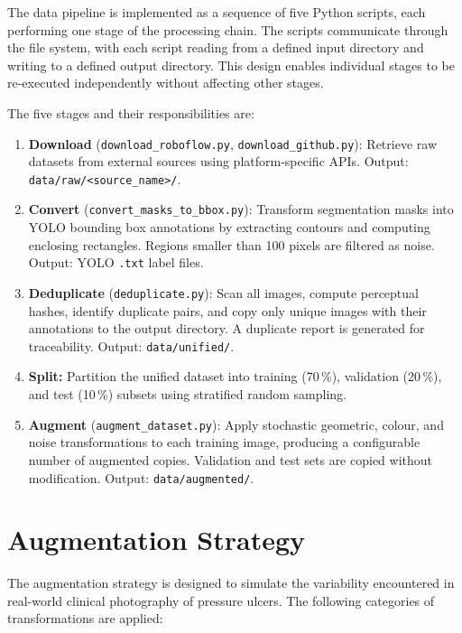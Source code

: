 \documentclass[a4paper,12pt,twoside]{report}
\begin{document}
The data pipeline is implemented as a sequence of five Python scripts, each
performing one stage of the processing chain. The scripts communicate through
the file system, with each script reading from a defined input directory and
writing to a defined output directory. This design enables individual stages to
be re-executed independently without affecting other stages.

The five stages and their responsibilities are:

\begin{enumerate}
  \item \textbf{Download} (\texttt{download\_roboflow.py},
    \texttt{download\_github.py}): Retrieve raw datasets from external sources
    using platform-specific APIs. Output: \texttt{data/raw/<source\_name>/}.

  \item \textbf{Convert} (\texttt{convert\_masks\_to\_bbox.py}): Transform
    segmentation masks into YOLO bounding box annotations by extracting contours
    and computing enclosing rectangles. Regions smaller than 100 pixels are
    filtered as noise. Output: YOLO \texttt{.txt} label files.

  \item \textbf{Deduplicate} (\texttt{deduplicate.py}): Scan all images, compute
    perceptual hashes, identify duplicate pairs, and copy only unique images with
    their annotations to the output directory. A duplicate report is generated for
    traceability. Output: \texttt{data/unified/}.

  \item \textbf{Split:} Partition the unified dataset into training (70\,\%),
    validation (20\,\%), and test (10\,\%) subsets using stratified random
    sampling.

  \item \textbf{Augment} (\texttt{augment\_dataset.py}): Apply stochastic
    geometric, colour, and noise transformations to each training image, producing
    a configurable number of augmented copies. Validation and test sets are copied
    without modification. Output: \texttt{data/augmented/}.
\end{enumerate}

\section{Augmentation Strategy}
\label{sec:augmentation-strategy}

The augmentation strategy is designed to simulate the variability encountered in
real-world clinical photography of pressure ulcers. The following categories of
transformations are applied:
\end{document}
